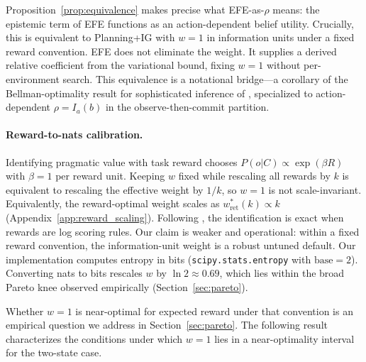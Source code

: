 \documentclass[runningheads]{llncs}
\begin{document}
Proposition~\ref{prop:equivalence} makes precise what EFE-as-$\rho$ means: the epistemic term of EFE functions as an action-dependent belief utility. Crucially, this is equivalent to Planning+IG with $w{=}1$ in information units under a fixed reward convention. EFE does not eliminate the weight. It supplies a derived relative coefficient from the variational bound, fixing $w{=}1$ without per-environment search. This equivalence is a notational bridge---a corollary of the Bellman-optimality result for sophisticated inference of \citet{dacosta2020b}, specialized to action-dependent $\rho = I_a(b)$ in the observe-then-commit partition.

\paragraph{Reward-to-nats calibration.}
Identifying pragmatic value with task reward chooses $P(o|C) \propto \exp(\beta R)$ with $\beta{=}1$ per reward unit. Keeping $w$ fixed while rescaling all rewards by $k$ is equivalent to rescaling the effective weight by $1/k$, so $w{=}1$ is not scale-invariant. Equivalently, the reward-optimal weight scales as $w^*_{\mathrm{ret}}(k)\propto k$ (Appendix~\ref{app:reward_scaling}). Following \citet{bernardo1979}, the identification is exact when rewards are log scoring rules. Our claim is weaker and operational: within a fixed reward convention, the information-unit weight is a robust untuned default. Our implementation computes entropy in bits (\texttt{scipy.stats.entropy} with $\mathrm{base}{=}2$). Converting nats to bits rescales $w$ by $\ln 2 \approx 0.69$, which lies within the broad Pareto knee observed empirically (Section~\ref{sec:pareto}).

Whether $w{=}1$ is near-optimal for expected reward under that convention is an empirical question we address in Section~\ref{sec:pareto}. The following result characterizes the conditions under which $w{=}1$ lies in a near-optimality interval for the two-state case.
\end{document}
